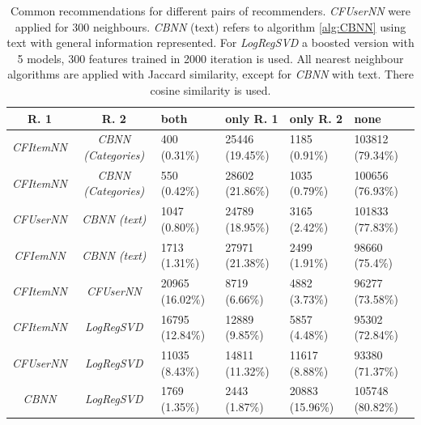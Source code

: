 \documentclass[10pt]{reportMaster}
\begin{document}
\begin{table}
	\begin{tabular}{|c|c||p{1.2cm}|p{1.2cm}|p{1.2cm}|p{1.2cm}|}
		\hline
		\textbf{R. 1}&\textbf{R. 2}&\textbf{both}&\textbf{only R. 1}&\textbf{only R. 2}&\textbf{none}\\ \hline
		\textit{CFItemNN}&\textit{CBNN (Categories)}&400 (0.31\%)&25446 (19.45\%)&1185 (0.91\%)&103812 (79.34\%)\\ \hline
		\textit{CFItemNN}&\textit{CBNN (Categories)}&550 (0.42\%)&28602 (21.86\%)&1035 (0.79\%)&100656 (76.93\%) \\ \hline
		\textit{CFUserNN}&\textit{CBNN (text)}&1047 (0.80\%)&24789 (18.95\%)&3165 (2.42\%)&101833 (77.83\%) \\ \hline
		\textit{CFIemNN}&\textit{CBNN (text)}&1713 (1.31\%)&27971 (21.38\%)&2499 (1.91\%)&98660 (75.4\%) \\ \hline
		\textit{CFItemNN}&\textit{CFUserNN}&20965 (16.02\%)&8719 (6.66\%)&4882 (3.73\%)&96277 (73.58\%) \\ \hline
		\textit{CFItemNN}&\textit{LogRegSVD}&16795 (12.84\%)&12889 (9.85\%)&5857 (4.48\%)&95302 (72.84\%) \\ \hline
		\textit{CFUserNN}&\textit{LogRegSVD}&11035 (8.43\%)&14811 (11.32\%)&11617 (8.88\%)&93380 (71.37\%) \\ \hline
		 \textit{CBNN}&\textit{LogRegSVD}&1769 (1.35\%)&2443 (1.87\%)&20883 (15.96\%)&105748 (80.82\%)\\ \hline
	\end{tabular}
	\caption{Common recommendations for different pairs of recommenders. \textit{CFUserNN} were applied for 300 neighbours. \textit{CBNN} (text) refers to algorithm \ref{alg:CBNN} using text with general information represented. For \textit{LogRegSVD} a boosted version with 5 models, 300 features trained in 2000 iteration is used. All nearest neighbour algorithms are applied with Jaccard similarity, except for \textit{CBNN} with text. There cosine similarity is used.}
\label{tab:correlation}
\end{table}
\end{document}

